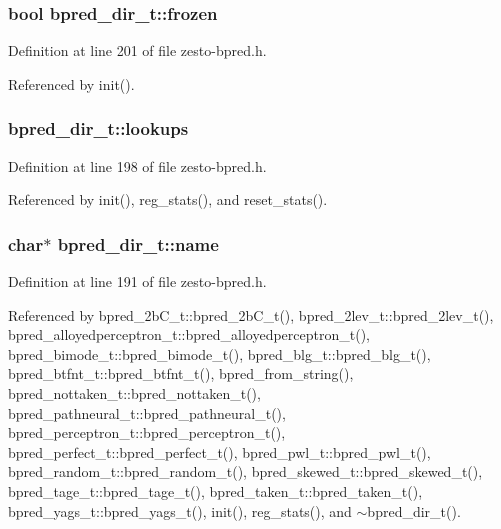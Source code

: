 \subsubsection[{frozen}]{\setlength{\rightskip}{0pt plus 5cm}bool {\bf bpred\_\-dir\_\-t::frozen}\hspace{0.3cm}{\tt  [protected]}}\label{classbpred__dir__t_976eb78d60d0956a4cc13018b110c102}




Definition at line 201 of file zesto-bpred.h.

Referenced by init().
\subsubsection[{lookups}]{ {\bf bpred\_\-dir\_\-t::lookups}\hspace{0.3cm}{\tt  [protected]}}\label{classbpred__dir__t_ecc5eb77ad09556f9aa4508bf97b22bc}




Definition at line 198 of file zesto-bpred.h.

Referenced by init(), reg\_\-stats(), and reset\_\-stats().
\subsubsection[{name}]{\setlength{\rightskip}{0pt plus 5cm}char$\ast$ {\bf bpred\_\-dir\_\-t::name}\hspace{0.3cm}{\tt  [protected]}}\label{classbpred__dir__t_9013be37a8f9cbcc52cc01fc1f8aafa9}




Definition at line 191 of file zesto-bpred.h.

Referenced by bpred\_\-2bC\_\-t::bpred\_\-2bC\_\-t(), bpred\_\-2lev\_\-t::bpred\_\-2lev\_\-t(), bpred\_\-alloyedperceptron\_\-t::bpred\_\-alloyedperceptron\_\-t(), bpred\_\-bimode\_\-t::bpred\_\-bimode\_\-t(), bpred\_\-blg\_\-t::bpred\_\-blg\_\-t(), bpred\_\-btfnt\_\-t::bpred\_\-btfnt\_\-t(), bpred\_\-from\_\-string(), bpred\_\-nottaken\_\-t::bpred\_\-nottaken\_\-t(), bpred\_\-pathneural\_\-t::bpred\_\-pathneural\_\-t(), bpred\_\-perceptron\_\-t::bpred\_\-perceptron\_\-t(), bpred\_\-perfect\_\-t::bpred\_\-perfect\_\-t(), bpred\_\-pwl\_\-t::bpred\_\-pwl\_\-t(), bpred\_\-random\_\-t::bpred\_\-random\_\-t(), bpred\_\-skewed\_\-t::bpred\_\-skewed\_\-t(), bpred\_\-tage\_\-t::bpred\_\-tage\_\-t(), bpred\_\-taken\_\-t::bpred\_\-taken\_\-t(), bpred\_\-yags\_\-t::bpred\_\-yags\_\-t(), init(), reg\_\-stats(), and $\sim$bpred\_\-dir\_\-t().
